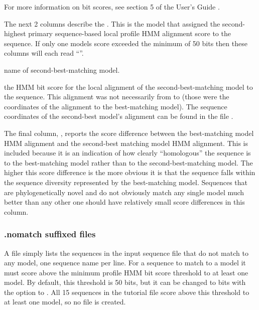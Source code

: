 For more information on bit scores, see section 5 of the 
User's Guide \cite{Nawrocki09}. 

The next 2 columns describe the . This is the
model that assigned the second-highest primary sequence-based local 
profile HMM alignment score to the sequence. If only one models score
exceeded the minimum of 50 bits then these columns will each read
``\prog{-}''.

\begin{wideitem}
\item[\emprog{model name}] name of second-best-matching model.

\item[\emprog{HMM sc}] the HMM bit score for the local alignment of
  the second-best-matching model to the sequence. This alignment was
  not necessarily from  to  (those were the
  coordinates of the alignment to the best-matching model). The
  sequence coordinates of the second-best model's alignment can be
  found in the file .
\end{wideitem}

The final column, , reports the score difference between
the best-matching model HMM alignment and the second-best matching
model HMM alignment. This is included because it is an indication of
how clearly ``homologous'' the sequence is to the best-matching model
rather than to the second-best-matching model. The higher this score
difference is the more obvious it is that the sequence falls within
the sequence diversity represented by the best-matching model.
Sequences that are phylogenetically novel and do not obviously match
any single model much better than any other one should have relatively
small score differences in this column.

\subsubsection{.nomatch suffixed files}

A  file simply lists the sequences in the input
sequence file that do not match to any model, one sequence name per
line. For a sequence to match to a model it must score above the
minimum profile HMM bit score threshold to at least one model. By
default, this threshold is 50 bits, but it can be changed to
 bits with the  option to . All
15 sequences in the tutorial file  score above this
threshold to at least one model, so no  file is
created. 

